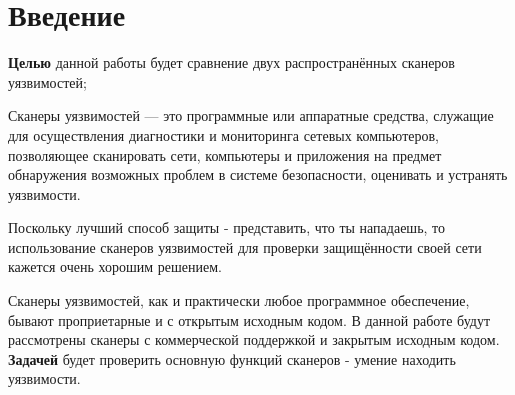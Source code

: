 \section*{Введение}
%

\textbf{Целью} данной работы будет сравнение двух распространённых сканеров уязвимостей;

Сканеры уязвимостей — это программные или аппаратные средства, служащие для осуществления диагностики и мониторинга сетевых компьютеров, позволяющее сканировать сети, компьютеры и приложения на предмет обнаружения возможных проблем в системе безопасности, оценивать и устранять уязвимости.

Поскольку лучший способ защиты - представить, что ты нападаешь, то использование сканеров уязвимостей для проверки защищённости своей сети кажется очень хорошим решением.

Сканеры уязвимостей, как и практически любое программное обеспечение, бывают проприетарные и с открытым исходным кодом. В данной работе будут рассмотрены сканеры с коммерческой поддержкой и закрытым исходным кодом. \textbf{Задачей} будет проверить основную функций сканеров - умение находить уязвимости.